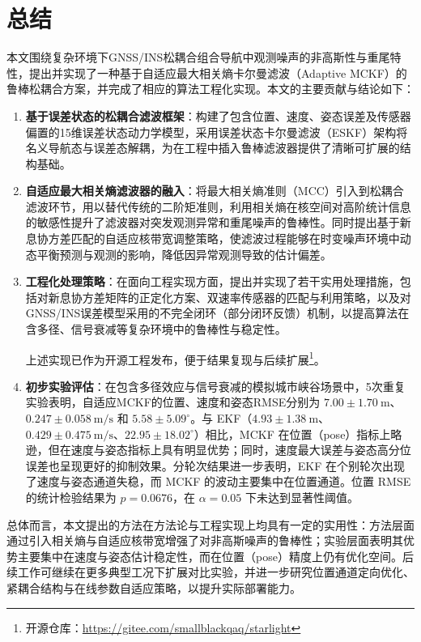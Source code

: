 \chapter{总结}

本文围绕复杂环境下GNSS/INS松耦合组合导航中观测噪声的非高斯性与重尾特性，提出并实现了一种基于自适应最大相关熵卡尔曼滤波（Adaptive MCKF）的鲁棒松耦合方案，并完成了相应的算法工程化实现。本文的主要贡献与结论如下：

\begin{enumerate}
\item \textbf{基于误差状态的松耦合滤波框架}：构建了包含位置、速度、姿态误差及传感器偏置的15维误差状态动力学模型，采用误差状态卡尔曼滤波（ESKF）架构将名义导航态与误差态解耦，为在工程中插入鲁棒滤波器提供了清晰可扩展的结构基础\cite{yan2019strapdown}。

\item \textbf{自适应最大相关熵滤波器的融入}：将最大相关熵准则（MCC）引入到松耦合滤波环节，用以替代传统的二阶矩准则，利用相关熵在核空间对高阶统计信息的敏感性提升了滤波器对突发观测异常和重尾噪声的鲁棒性。同时提出基于新息协方差匹配的自适应核带宽调整策略，使滤波过程能够在时变噪声环境中动态平衡预测与观测的影响，降低因异常观测导致的估计偏差\cite{izanloo2016kalman,xie2025adaptive}。


\item \textbf{工程化处理策略}：在面向工程实现方面，提出并实现了若干实用处理措施，包括对新息协方差矩阵的正定化方案、双速率传感器的匹配与利用策略，以及对GNSS/INS误差模型采用的不完全闭环（部分闭环反馈）机制，以提高算法在含多径、信号衰减等复杂环境中的鲁棒性与稳定性。

上述实现已作为开源工程发布，便于结果复现与后续扩展\footnote{开源仓库：\url{https://gitee.com/smallblackqaq/starlight}}。

\item \textbf{初步实验评估}：在包含多径效应与信号衰减的模拟城市峡谷场景中，5次重复实验表明，自适应MCKF的位置、速度和姿态RMSE分别为 $7.00\pm1.70~\mathrm{m}$、$0.247\pm0.058~\mathrm{m/s}$ 和 $5.58\pm5.09^{\circ}$。与 EKF（$4.93\pm1.38~\mathrm{m}$、$0.429\pm0.475~\mathrm{m/s}$、$22.95\pm18.02^{\circ}$）相比，MCKF 在位置（pose）指标上略逊，但在速度与姿态指标上具有明显优势；同时，速度最大误差与姿态高分位误差也呈现更好的抑制效果。分轮次结果进一步表明，EKF 在个别轮次出现了速度与姿态通道失稳，而 MCKF 的波动主要集中在位置通道。位置 RMSE 的统计检验结果为 $p=0.0676$，在 $\alpha=0.05$ 下未达到显著性阈值。
\end{enumerate}

总体而言，本文提出的方法在方法论与工程实现上均具有一定的实用性：方法层面通过引入相关熵与自适应核带宽增强了对非高斯噪声的鲁棒性；实验层面表明其优势主要集中在速度与姿态估计稳定性，而在位置（pose）精度上仍有优化空间。后续工作可继续在更多典型工况下扩展对比实验，并进一步研究位置通道定向优化、紧耦合结构与在线参数自适应策略，以提升实际部署能力。